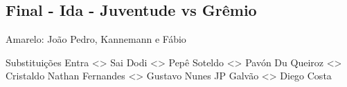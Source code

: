 \newpage
\subsection{Final - Ida - Juventude vs Grêmio}

\begin{figure}[H]
    \centering
    
\end{figure}

Amarelo: João Pedro, Kannemann e Fábio

Substituições
Entra <> Sai
Dodi <> Pepê
Soteldo <> Pavón
Du Queiroz <> Cristaldo
Nathan Fernandes <> Gustavo Nunes
JP Galvão <> Diego Costa
